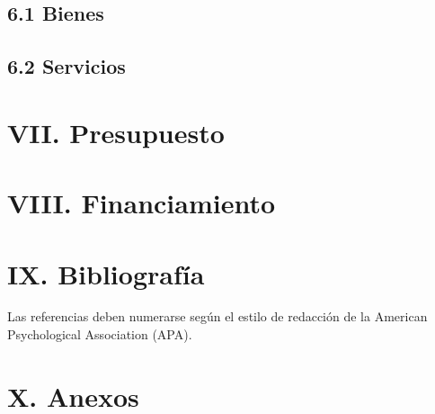 \documentclass[12pt]{../componentes/uns}
\begin{document}
\subsection*{6.1 Bienes}
\lipsum[23]

\subsection*{6.2 Servicios}
\lipsum[24]

\section*{VII. Presupuesto}
\lipsum[25]

\section*{VIII. Financiamiento}
\lipsum[26]

\section*{IX. Bibliografía}
Las referencias deben numerarse según el estilo de redacción de la American Psychological Association (APA).

\section*{X. Anexos}
\lipsum[27]
\end{document}
